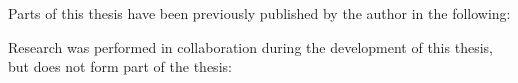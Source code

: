 
\begin{thesisdeclaration}

\noindent Parts of this thesis have been previously published by the author in the following:


\noindent Research was performed in collaboration during the development of this thesis, but does not form part of the thesis:


\end{thesisdeclaration}

